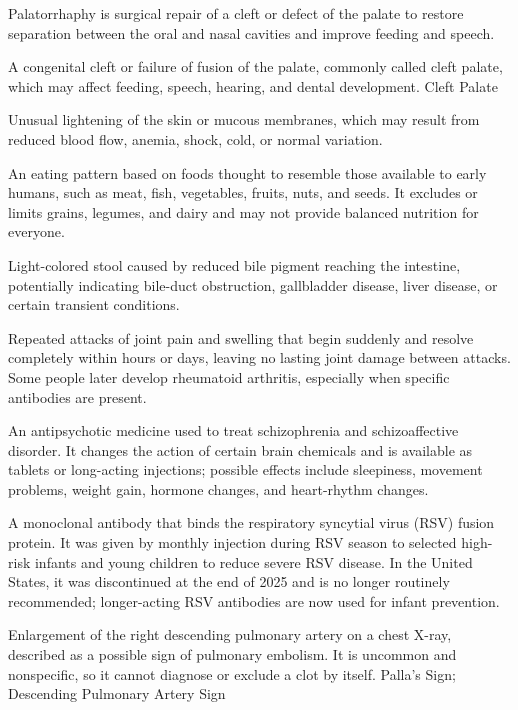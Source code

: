  Palatorrhaphy is surgical repair of a cleft or defect of the palate to restore separation between the oral and nasal cavities and improve feeding and speech.

 A congenital cleft or failure of fusion of the palate, commonly called cleft palate, which may affect feeding, speech, hearing, and dental development.
\synonyms
Cleft Palate

 Unusual lightening of the skin or mucous membranes, which may result from reduced blood flow, anemia, shock, cold, or normal variation.

 An eating pattern based on foods thought to resemble those available to early humans, such as meat, fish, vegetables, fruits, nuts, and seeds. It excludes or limits grains, legumes, and dairy and may not provide balanced nutrition for everyone.

 Light-colored stool caused by reduced bile pigment reaching the intestine, potentially indicating bile-duct obstruction, gallbladder disease, liver disease, or certain transient conditions.

 Repeated attacks of joint pain and swelling that begin suddenly and resolve completely within hours or days, leaving no lasting joint damage between attacks. Some people later develop rheumatoid arthritis, especially when specific antibodies are present.

 An antipsychotic medicine used to treat schizophrenia and schizoaffective disorder. It changes the action of certain brain chemicals and is available as tablets or long-acting injections; possible effects include sleepiness, movement problems, weight gain, hormone changes, and heart-rhythm changes.

 A monoclonal antibody that binds the respiratory syncytial virus (RSV) fusion protein. It was given by monthly injection during RSV season to selected high-risk infants and young children to reduce severe RSV disease. In the United States, it was discontinued at the end of 2025 and is no longer routinely recommended; longer-acting RSV antibodies are now used for infant prevention.

 Enlargement of the right descending pulmonary artery on a chest X-ray, described as a possible sign of pulmonary embolism. It is uncommon and nonspecific, so it cannot diagnose or exclude a clot by itself.
\synonyms
Palla's Sign; Descending Pulmonary Artery Sign

